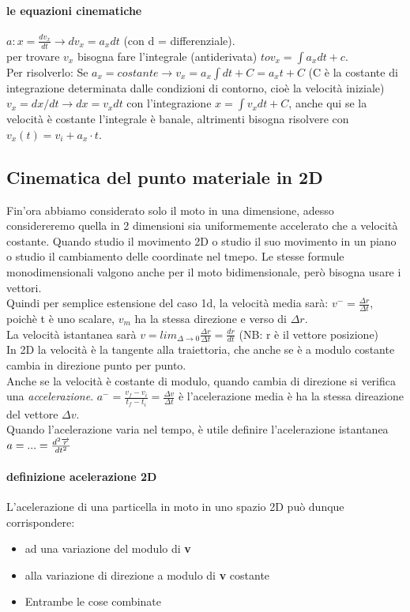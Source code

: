 \documentclass[12pt, a4paper, openany]{book}
\begin{document}
\paragraph*{le equazioni cinematiche} $a:x = \frac{dv_x}{dt} \to dv_x = a_xdt$ (con d = differenziale).
\\per trovare $v_x$ bisogna fare l'integrale (antiderivata) $to v_x = \int a_xdt+c$.
\\Per risolverlo: Se $a_x = costante \to v_x = a_x \int dt + C = a_xt+C$ (C è la costante di integrazione determinata dalle condizioni di contorno, cioè la velocità iniziale)
\\$v_x = dx/dt \to dx=v_xdt$ con l'integrazione $x = \int v_xdt + C$, anche qui se la velocità è costante l'integrale è banale, altrimenti bisogna risolvere con $v_x(t) = v_i + a_x \cdot t$.

    \subsection*{Cinematica del punto materiale in 2D}
    Fin'ora abbiamo considerato solo il moto in una dimensione, adesso considereremo quella in 2 dimensioni sia uniformemente accelerato che a velocità costante.
    Quando studio il movimento 2D o studio il suo movimento in un piano o studio il cambiamento delle coordinate nel tmepo.
    Le stesse formule monodimensionali valgono anche per il moto bidimensionale, però bisogna usare i vettori.
    \\Quindi per semplice estensione del caso 1d, la velocità media sarà: $v^- = \frac{\Delta r}{\Delta t}$, poichè t è uno scalare, $v_m$ ha la stessa direzione e verso di $\Delta r$.
    \\La velocità istantanea sarà $v = lim_{\Delta \to 0 } \frac{\Delta r}{\Delta t} = \frac{dr}{dt}$ (NB: r è il vettore posizione)
    \\In 2D la velocità è la tangente alla traiettoria, che anche se è a modulo costante cambia in direzione punto per punto.
    \\Anche se la velocità è costante di modulo, quando cambia di direzione si verifica una \emph{accelerazione}.
$a^- = \frac{v_f-v_i}{t_f-t_i}= \frac{\Delta v}{\Delta t}$ è l'acelerazione media è ha la stessa direazione del vettore $\Delta v$.
    \\Quando l'acelerazione varia nel tempo, è utile definire l'acelerazione istantanea $a = ... = \frac{d^2 \overrightarrow{r} }{dt^2}$
    \paragraph*{definizione acelerazione 2D} L'acelerazione di una particella in moto in uno spazio 2D può dunque corrispondere:
    \begin{itemize}
        \item ad una variazione del modulo di \textbf{v}
        \item alla variazione di direzione a modulo di \textbf{v} costante
        \item Entrambe le cose combinate
    \end{itemize}
\end{document}

